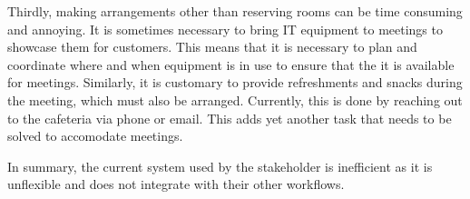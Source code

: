 Thirdly, making arrangements other than reserving rooms can be time consuming and annoying. 
It is sometimes necessary to bring IT equipment to meetings to showcase them for customers.
This means that it is necessary to plan and coordinate where and when equipment is in use to ensure that the it is available for meetings. 
Similarly, it is customary to provide refreshments and snacks during the meeting, which must also be arranged. 
Currently, this is done by reaching out to the cafeteria via phone or email.
This adds yet another task that needs to be solved to accomodate meetings. 

In summary, the current system used by the stakeholder is inefficient as it is unflexible and does not integrate with their other workflows.